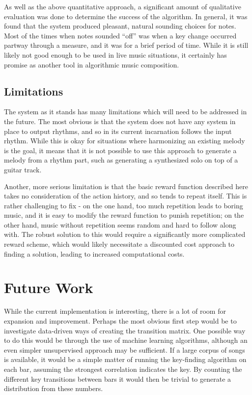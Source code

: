 \documentclass[11pt]{article} %
\begin{document}
As well as the above quantitative approach, a significant amount of qualitative evaluation was done to determine the success of the algorithm. In general, it was found that the system produced pleasant, natural sounding choices for notes. Most of the times when notes sounded ``off'' was when a key change occurred partway through a measure, and it was for a brief period of time. While it is still likely not good enough to be used in live music situations, it certainly has promise as another tool in algorithmic music composition.

\subsection{Limitations}
The system as it stands has many limitations which will need to be addressed in the future. The most obvious is that the system does not have any system in place to output rhythms, and so in its current incarnation follows the input rhythm. While this is okay for situations where harmonizing an existing melody is the goal, it means that it is not possible to use this approach to generate a melody from a rhythm part, such as generating a synthesized solo on top of a guitar track. 

Another, more serious limitation is that the basic reward function described here takes no consideration of the action history, and so tends to repeat itself. This is rather challenging to fix - on the one hand, too much repetition leads to boring music, and it is easy to modify the reward function to punish repetition; on the other hand, music without repetition seems random and hard to follow along with. The robust solution to this would require a significantly more complicated reward scheme, which would likely necessitate a discounted cost approach to finding a solution, leading to increased computational costs.

\section{Future Work}
While the current implementation is interesting, there is a lot of room for expansion and improvement. Perhaps the most obvious first step would be to investigate data-driven ways of creating the transition matrix. One possible way to do this would be through the use of machine learning algorithms, although an even simpler unsupervised approach may be sufficient. If a large corpus of songs is available, it would be a simple matter of running the key-finding algorithm on each bar, assuming the strongest correlation indicates the key. By counting the different key transitions between bars it would then be trivial to generate a distribution from these numbers. 
\end{document}
